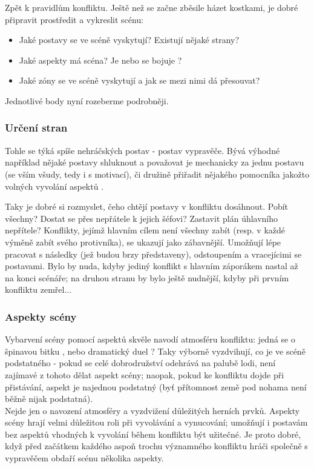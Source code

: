Zpět k pravidlům konfliktu. Ještě než se začne zběsile házet kostkami, je dobré připravit prostředit a vykreslit scénu:

\begin{itemize}
\item Jaké postavy se ve scéně vyskytují? Existují nějaké strany?
\item Jaké aspekty má scéna? Je  nebo se bojuje ?
\item Jaké zóny se ve scéně vyskytují a jak se mezi nimi dá přesouvat?
\end{itemize}

Jednotlivé body nyní rozeberme podrobněji.

\subsubsection{Určení stran}
\label{sec:urcenistran}
Tohle se týká spíše nehráčských postav - postav vypravěče. Bývá výhodné například nějaké postavy shluknout a považovat je mechanicky za jednu postavu (se vším všudy, tedy i s motivací), či družině přiřadit nějakého pomocníka jakožto volných vyvolání aspektů .

Taky je dobré si rozmyslet, čeho chtějí postavy v konfliktu dosáhnout. Pobít všechny? Dostat se přes nepřátele k jejich šéfovi? Zastavit plán úhlavního nepřítele? Konflikty, jejímž hlavním cílem není všechny zabít (resp. v každé výměně zabít svého protivníka), se ukazují jako zábavnější. Umožňují lépe pracovat s následky (jež budou brzy představeny), odstoupením a vracejícimi se postavami. Bylo by nuda, kdyby jediný konflikt s hlavním záporákem nastal až na konci scénáře; na druhou stranu by bylo ještě nudnější, kdyby při prvním konfliktu zemřel...

\subsubsection{Aspekty scény}
\label{sec:aspektysceny}

Vybarvení scény pomocí aspektů skvěle navodí atmosféru konfliktu: jedná se o špinavou bitku , nebo dramatický duel ? Taky výborně vyzdvihují, co je ve scéně podstatného - pokud se celé dobrodružství odehrává na palubě lodi, není zajímavé z tohoto dělat aspekt scény; naopak, pokud ke konfliktu dojde při přistávání, aspekt  je najednou podstatný (byť přítomnost země pod nohama není běžně nijak podstatná).\\
Nejde jen o navození atmosféry a vyzdvižení důležitých herních prvků. Aspekty scény hrají velmi důležitou roli při vyvolávání a vynucování; umožňují i postavám bez aspektů vhodných k vyvolání během konfliktu být užitečné. Je proto dobré, když před začátkem každého aspoň trochu významného konfliktu hráči společně s vypravěčem obdaří scénu několika aspekty.

